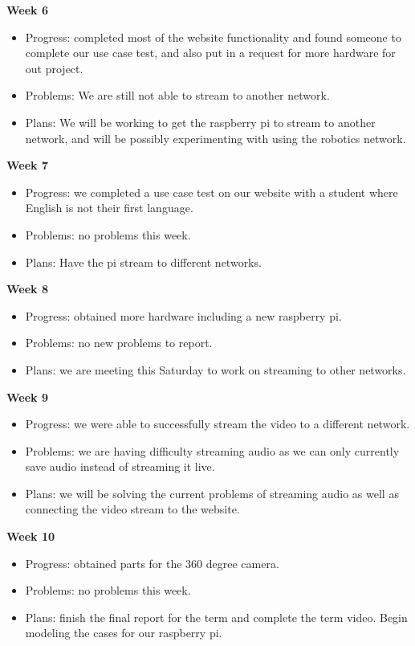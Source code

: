 \documentclass[onecolumn, draftclsnofoot,10pt, compsoc]{IEEEtran}
\begin{document}
\textbf{Week 6}
\begin{itemize}
    \item Progress: completed most of the website functionality and found someone to complete our use case test, and also put in a request for more hardware for out project.
    \item Problems: We are still not able to stream to another network.
    \item Plans: We will be working to get the raspberry pi to stream to another network, and will be possibly experimenting with using the robotics network.
\end{itemize}
\textbf{Week 7}
\begin{itemize}
    \item Progress: we completed a use case test on our website with a student where English is not their first language.
    \item Problems: no problems this week.
    \item Plans: Have the pi stream to different networks.
\end{itemize}
\textbf{Week 8}
\begin{itemize}
    \item Progress: obtained more hardware including a new raspberry pi.
    \item Problems: no new problems to report.
    \item Plans: we are meeting this Saturday to work on streaming to other networks.
\end{itemize}
\textbf{Week 9}
\begin{itemize}
    \item Progress: we were able to successfully stream the video to a different network.
    \item Problems: we are having difficulty streaming audio as we can only currently save audio instead of streaming it live.
    \item Plans: we will be solving the current problems of streaming audio as well as connecting the video stream to the website.
\end{itemize}
\textbf{Week 10}
\begin{itemize}
    \item Progress: obtained parts for the 360 degree camera.
    \item Problems: no problems this week.
    \item Plans: finish the final report for the term and complete the term video. Begin modeling the cases for our raspberry pi. 
\end{itemize}
\end{document}
